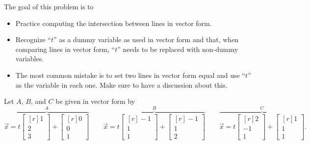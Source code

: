 \documentclass{problemset}
\newcommand{\mat}[1]{\begin{bmatrix*}[r]#1\end{bmatrix*}}
\begin{document}
	\question
	\begin{annotation}
		\begin{goals}

			The goal of this problem is to
			\begin{itemize}
				\item Practice computing the intersection between lines
					in vector form.
				\item Recognize ``$t$'' as a dummy variable as used
					in vector form and that, when comparing lines in
					vector form, ``$t$'' needs to be replaced with
					non-dummy variables.
			\end{itemize}
		\end{goals}

		\begin{notes}
			\begin{itemize}
				\item The most common mistake is to set two lines
					in vector form equal and use ``$t$'' as
					the variable in each one. Make sure to have a discussion
					about this.
			\end{itemize}
		\end{notes}
	\end{annotation}
	Let $A$, $B$, and $C$ be given in vector form by
	\[
	\overbrace{\vec x=t\mat{1\\2\\3}+\mat{0\\0\\1}}^{\displaystyle A}
	\qquad \overbrace{\vec x=t\mat{-1\\1\\1}+\mat{-1\\1\\2}}^{\displaystyle B}
	\qquad \overbrace{\vec x=t\mat{2\\-1\\1}+\mat{1\\1\\1}}^{\displaystyle C}.
	\]
\end{document}
